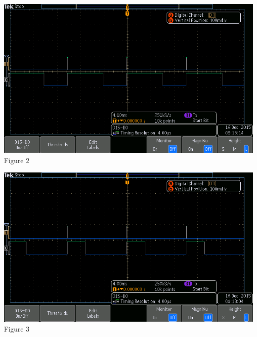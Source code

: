 \documentclass[12pt]{article}
\begin{document}
\begin {center}
\includegraphics[scale=.75]{half-power}
\\
Figure 2
\end {center}
\begin {center}
\includegraphics[scale=.75]{quarter-power}
\\
Figure 3
\end {center}
\end{document}
